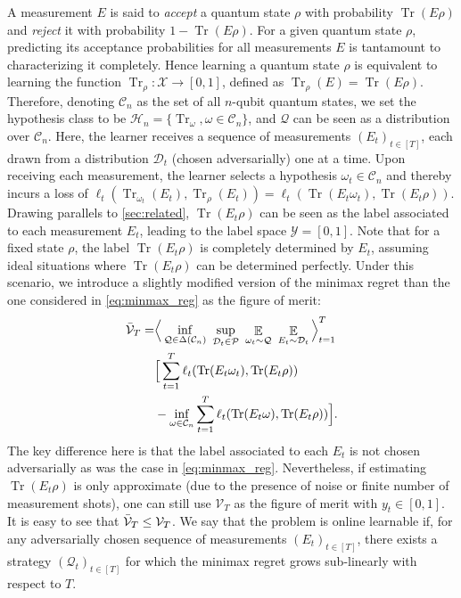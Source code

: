 A measurement $E$  is said to {\it accept} a quantum state $\rho$ with probability $\operatorname{Tr}(E\rho)$ and {\it reject} it with probability $1 - \operatorname{Tr}(E\rho)$. For a given quantum state $\rho$, predicting its acceptance probabilities for all measurements $E$ is tantamount to characterizing it completely. Hence learning a quantum state $\rho$ is equivalent to learning the function $\operatorname{Tr}_\rho \colon \mathcal X \rightarrow [0,1]$, defined as $\operatorname{Tr}_\rho (E) = \operatorname{Tr}(E \rho)$. Therefore, denoting $\mathcal C_n$ as the set of all $n$-qubit quantum states, we  set the hypothesis class to be $\mathcal{H}_n=\{\operatorname{Tr}_\omega, \omega\in\mathcal C_n\}$, and $\mathcal Q$ can be seen as a distribution over $\mathcal C_n$. Here, the learner receives a sequence of measurements  $(E_t)_{t \in [T]}$, each drawn from a distribution $\mathcal{D}_t$ (chosen adversarially) one at a time. Upon receiving each measurement, the learner selects a hypothesis $\omega_t \in \mathcal{C}_n$ and thereby incurs a loss of $\ell_t (\operatorname{Tr}_{\omega_t} (E_t), \operatorname{Tr}_{\rho} (E_t)) = \ell_t (\operatorname{Tr} (E_t\omega_t ), \operatorname{Tr}(E_t\rho ))$. Drawing parallels to \cref{sec:related}, $\operatorname{Tr}(E_t\rho )$ can be seen as the label associated to each measurement $E_t$, leading to the label space $\mathcal Y =[0,1]$. Note that for a fixed state $\rho$, the label $\operatorname{Tr} (E_t \rho)$ is completely determined by $E_t$, assuming ideal situations where $\operatorname{Tr} (E_t \rho)$ can be determined perfectly. Under this scenario, we introduce a slightly modified version of the minimax regret than the one considered in \cref{eq:minmax_reg} as the figure of merit:
\begin{equation}
    \label{eq:minmax_reg_no_label}
    \begin{aligned}
         \Bar{\mathcal{V}}_T = &\Big< \inf_{\mathcal{Q} \in \Delta(\mathcal{C}_n)} \ \sup_{\mathcal{D}_t \in \mathcal{P}} \   \mathop{\mathbb{E}}_{{\omega_t} \sim \mathcal{Q}} \  \mathop{\mathbb{E}}_{E_t \sim \mathcal{D}_t} \Big>_{t=1}^T \\
         &\Big[ \sum_{t=1}^T \ell_t (\operatorname{Tr} (E_t\omega_t ), \operatorname{Tr}(E_t\rho )) \\&- \inf_{\omega \in \mathcal{C}_n} \sum_{t=1}^T \ell_t (\operatorname{Tr} (E_t\omega ), \operatorname{Tr}(E_t\rho )) \Big].
    \end{aligned}
\end{equation}
The key difference here is that the label associated to each $E_t$ is not chosen adversarially as was the case in \cref{eq:minmax_reg}. Nevertheless, if estimating $\operatorname{Tr} (E_t \rho)$ is only approximate (due to the presence of noise or finite number of measurement shots), one can still use $\mathcal{V}_T$ as the figure of merit with $y_t \in [0,1]$. It is easy to see that $\Bar{\mathcal{V}}_T \leq \mathcal{V}_T$. We say that the problem is online learnable if, for any adversarially chosen sequence of measurements  $(E_t)_{t\in [T]}$, there exists a strategy $(\mathcal{Q}_t)_{t \in [T]}$ for which the minimax regret grows sub-linearly with respect to $T$.

